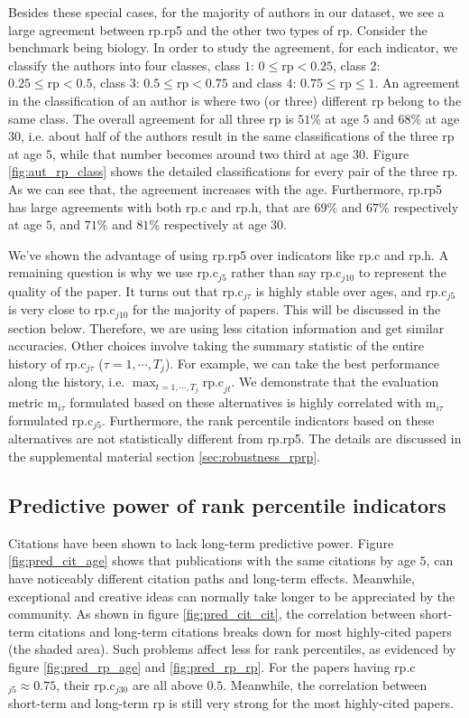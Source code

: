 Besides these special cases, for the majority of authors in our dataset, we see a large agreement between rp.rp5 and the other two types of rp. Consider the benchmark being biology. In order to study the agreement, for each indicator, we classify the authors into four classes, class $1$: $0\le \text{rp} < 0.25$, class $2$: $0.25\le \text{rp} < 0.5$, class $3$: $0.5 \le \text{rp} < 0.75$ and class $4$: $0.75 \le \text{rp} \le 1$. An agreement in the classification of an author is where two (or three) different rp belong to the same class. The overall agreement for all three rp is $51\%$ at age $5$ and $68\%$ at age $30$, i.e. about half of the authors result in the same classifications of the three rp at age $5$, while that number becomes around two third at age $30$. Figure \ref{fig:aut_rp_class} shows the detailed classifications for every pair of the three rp. As we can see that, the agreement increases with the age. Furthermore, rp.rp5 has large agreements with both rp.c and rp.h, that are $69\%$ and $67\%$ respectively at age $5$, and $71\%$ and $81\%$ respectively at age $30$. 

We've shown the advantage of using rp.rp5 over indicators like rp.c and rp.h. A remaining question is why we use rp.c$_{j5}$ rather than say rp.c$_{j10}$ to represent the quality of the paper. It turns out that rp.c$_{j\tau}$ is highly stable over ages, and rp.c$_{j5}$ is very close to rp.c$_{j10}$ for the majority of papers. This will be discussed in the section below. Therefore, we are using less citation information and get similar accuracies. Other choices involve taking the summary statistic of the entire history of rp.c$_{j\tau}$ ($\tau=1,\cdots,T_j$). For example, we can take the best performance along the history, i.e. $\displaystyle \max_{t=1,\cdots,T_j} \text{rp.c}_{jt}$. We demonstrate that the evaluation metric m$_{i\tau}$ formulated based on these alternatives is highly correlated with m$_{i\tau}$ formulated rp.c$_{j5}$. Furthermore, the rank percentile indicators based on these alternatives are not statistically different from rp.rp5. The details are discussed in the supplemental material section \ref{sec:robustness_rprp}.

\subsection*{Predictive power of rank percentile indicators}
Citations have been shown to lack long-term predictive power\supercite{Wang2013}. Figure \ref{fig:pred_cit_age} shows that publications with the same citations by age $5$, can have noticeably different citation paths and long-term effects. Meanwhile, exceptional and creative ideas can normally take longer to be appreciated by the community. As shown in figure \ref{fig:pred_cit_cit}, the correlation between short-term citations and long-term citations breaks down for most highly-cited papers (the shaded area). Such problems affect less for rank percentiles, as evidenced by figure \ref{fig:pred_rp_age} and \ref{fig:pred_rp_rp}. For the papers having rp.c$_{j 5} \approx 0.75$, their rp.c$_{j 30}$ are all above $0.5$. Meanwhile, the correlation between short-term and long-term rp is still very strong for the most highly-cited papers. 

